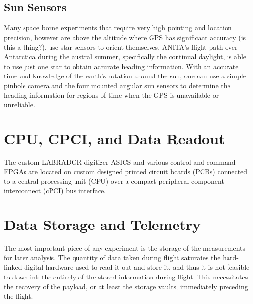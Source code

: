 	\subsection{Sun Sensors}
		Many space borne experiments that require very high pointing and location precision, however are above the altitude where GPS has significant accuracy (is this a thing?), use star sensors to orient themselves.  ANITA's flight path over Antarctica during the austral summer, specifically the continual daylight, is able to use just one star to obtain accurate heading information.  With an accurate time and knowledge of the earth's rotation around the sun, one can use a simple pinhole camera and the four mounted angular sun sensors to determine the heading information for regions of time when the GPS is unavailable or unreliable.
		
\section{CPU, CPCI, and Data Readout}
	The custom LABRADOR digitizer ASICS and various control and command FPGAs are located on custom designed printed circuit boards (PCBs) connected to a central processing unit (CPU) over a compact peripheral component interconnect (cPCI) bus interface.  
	
\section{Data Storage and Telemetry}
	The most important piece of any experiment is the storage of the measurements for later analysis.  The quantity of data taken during flight saturates the hard-linked digital hardware used to read it out and store it, and thus it is not feasible to downlink the entirely of the stored information during flight.  This necessitates the recovery of the payload, or at least the storage vaults, immediately preceding the flight.

